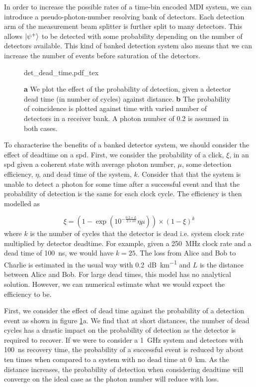 In order to increase the possible rates of a time-bin encoded \ac{MDI} system, we can introduce a pseudo-photon-number resolving bank of detectors. Each detection arm of the measurement beam splitter is further split to many detectors. This allows $\ket{\psi^+}$ to be detected with some probability depending on the number of detectors available. This kind of banked detection system also means that we can increase the number of events before saturation of the detectors. 

\begin{figure}[tbp]
	\centering
	\tiny
	\def\svgwidth{\textwidth} 
	{det_dead_time.pdf_tex}
	\caption[Effect of detector dead time and banked detectors]{\textbf{a} We plot the effect of the probability of detection, given a detector dead time (in number of cycles) against distance. \textbf{b} The probability of coincidence is plotted against time with varied number of detectors in a receiver bank. A photon number of 0.2 is assumed in both cases. }
	\label{fig:det_eff_dead_time}
\end{figure}

To characterise the benefits of a banked detector system, we should consider the effect of deadtime on a \ac{spd}. First, we consider the probability of a click, $\xi$, in an \ac{spd} given a coherent state with average photon number, $\mu$, some detection efficiency, $\eta$, and dead time of the system, $k$. Consider that that the system is unable to detect a photon for some time after a successful event and that the probability of detection is the same for each clock cycle. The efficiency is then modelled as

\begin{equation}
	\xi = ( 1 - \exp(10^{-\frac{0.2 \times L}{2 \times 10}} \eta \mu) ) \times (1 - \xi)^k
\end{equation}
where $k$ is the number of cycles that the detector is dead i.e. system clock rate multiplied by detector deadtime. For example, given a \SI{250}{\MHz} clock rate and a dead time of \SI{100}{ns}, we would have $k=25$. The loss from Alice and Bob to Charlie is estimated in the usual way with \SI{0.2}{dB\per\km} and $L$ is the distance between Alice and Bob. For large dead times, this model has no analytical solution. However, we can numerical estimate what we would expect the efficiency to be.

First, we consider the effect of dead time against the probability of a detection event as shown in figure \ref{fig:det_eff_dead_time}a. We find that at short distances, the number of dead cycles has a drastic impact on the probability of detection as the detector is required to recover. If we were to consider a \SI{1}{GHz} system and detectors with \SI{100}{ns} recovery time, the probability of a successful event is reduced by about ten times when compared to a system with no dead time at \SI{0}{\km}. As the distance increases, the probability of detection when considering deadtime will converge on the ideal case as the photon number will reduce with loss. 

